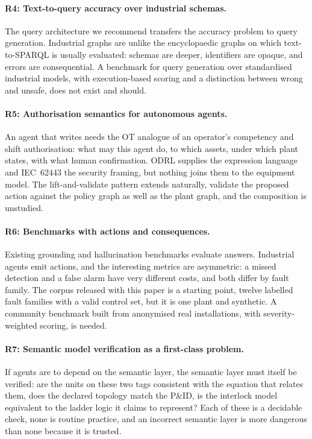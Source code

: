 \paragraph{R4: Text-to-query accuracy over industrial schemas.} The query
architecture we recommend transfers the accuracy problem to query generation.
Industrial graphs are unlike the encyclopaedic graphs on which text-to-SPARQL is
usually evaluated: schemas are deeper, identifiers are opaque, and errors are
consequential. A benchmark for query generation over standardised industrial
models, with execution-based scoring and a distinction between wrong and
unsafe, does not exist and should.

\paragraph{R5: Authorisation semantics for autonomous agents.} An agent that
writes needs the OT analogue of an operator's competency and shift authorisation:
what may this agent do, to which assets, under which plant states, with what
human confirmation. ODRL supplies the expression language and IEC~62443
\cite{iec62443} the security framing, but nothing joins them to the equipment
model. The
lift-and-validate pattern extends naturally, validate the proposed action
against the policy graph as well as the plant graph, and the composition is
unstudied.

\paragraph{R6: Benchmarks with actions and consequences.} Existing grounding
and hallucination benchmarks evaluate answers. Industrial agents emit actions,
and the interesting metrics are asymmetric: a missed detection and a false alarm
have very different costs, and both differ by fault family. The corpus released
with this paper is a starting point, twelve labelled fault families with a
valid control set, but it is one plant and synthetic. A community benchmark
built from anonymised real installations, with severity-weighted scoring, is
needed.

\paragraph{R7: Semantic model verification as a first-class problem.} If
agents are to depend on the semantic layer, the semantic layer must itself be
verified: are the units on these two tags consistent with the equation that
relates them, does the declared topology match the P\&ID, is the interlock model
equivalent to the ladder logic it claims to represent? Each of these is a
decidable check, none is routine practice, and an incorrect semantic layer is
more dangerous than none because it is trusted.

